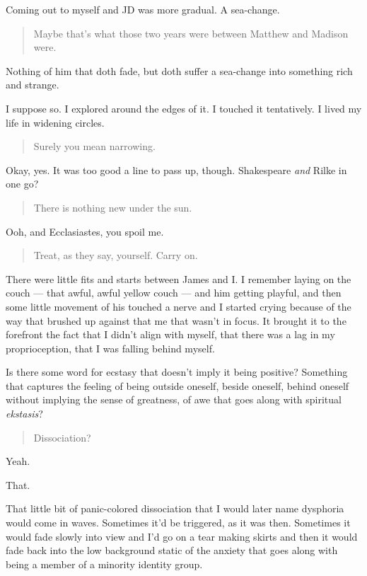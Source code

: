 Coming out to myself and JD was more gradual. A sea-change.

\begin{quote}
Maybe that's what those two years were between Matthew and Madison were.
\end{quote}

Nothing of him that doth fade, but doth suffer a sea-change into something rich and strange.

I suppose so. I explored around the edges of it. I touched it tentatively. I lived my life in widening circles.

\begin{quote}
Surely you mean narrowing.
\end{quote}

Okay, yes. It was too good a line to pass up, though. Shakespeare \emph{and} Rilke in one go?

\begin{quote}
There is nothing new under the sun.
\end{quote}

Ooh, and Ecclasiastes, you spoil me.

\begin{quote}
Treat, as they say, yourself. Carry on.
\end{quote}

There were little fits and starts between James and I. I remember laying on the couch --- that awful, awful yellow couch --- and him getting playful, and then some little movement of his touched a nerve and I started crying because of the way that brushed up against that me that wasn't in focus. It brought it to the forefront the fact that I didn't align with myself, that there was a lag in my proprioception, that I was falling behind myself.

Is there some word for ecstasy that doesn't imply it being positive? Something that captures the feeling of being outside oneself, beside oneself, behind oneself without implying the sense of greatness, of awe that goes along with spiritual \emph{ekstasis}?

\begin{quote}
Dissociation?
\end{quote}

Yeah.

That.

That little bit of panic-colored dissociation that I would later name dysphoria would come in waves. Sometimes it'd be triggered, as it was then. Sometimes it would fade slowly into view and I'd go on a tear making skirts and then it would fade back into the low background static of the anxiety that goes along with being a member of a minority identity group.

